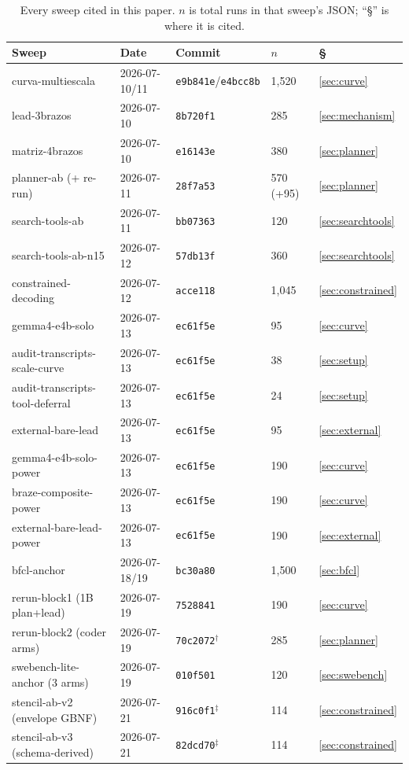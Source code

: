 \documentclass[smallcondensed,natbib]{svjour3}
\begin{document}
\begin{table}[t]
\centering\small
\caption{Every sweep cited in this paper. $n$ is total runs in that
sweep's JSON; ``\S'' is where it is cited.}
\label{tab:sweeps}
\begin{tabular}{lllll}
\toprule
Sweep & Date & Commit & $n$ & \S \\
\midrule
curva-multiescala & 2026-07-10/11 & \texttt{e9b841e}/\texttt{e4bcc8b} & 1{,}520 & \ref{sec:curve} \\
lead-3brazos & 2026-07-10 & \texttt{8b720f1} & 285 & \ref{sec:mechanism} \\
matriz-4brazos & 2026-07-10 & \texttt{e16143e} & 380 & \ref{sec:planner} \\
planner-ab (+ re-run) & 2026-07-11 & \texttt{28f7a53} & 570 (+95) & \ref{sec:planner} \\
search-tools-ab & 2026-07-11 & \texttt{bb07363} & 120 & \ref{sec:searchtools} \\
search-tools-ab-n15 & 2026-07-12 & \texttt{57db13f} & 360 & \ref{sec:searchtools} \\
constrained-decoding & 2026-07-12 & \texttt{acce118} & 1{,}045 & \ref{sec:constrained} \\
gemma4-e4b-solo & 2026-07-13 & \texttt{ec61f5e} & 95 & \ref{sec:curve} \\
audit-transcripts-scale-curve & 2026-07-13 & \texttt{ec61f5e} & 38 & \ref{sec:setup} \\
audit-transcripts-tool-deferral & 2026-07-13 & \texttt{ec61f5e} & 24 & \ref{sec:setup} \\
external-bare-lead & 2026-07-13 & \texttt{ec61f5e} & 95 & \ref{sec:external} \\
gemma4-e4b-solo-power & 2026-07-13 & \texttt{ec61f5e} & 190 & \ref{sec:curve} \\
braze-composite-power & 2026-07-13 & \texttt{ec61f5e} & 190 & \ref{sec:curve} \\
external-bare-lead-power & 2026-07-13 & \texttt{ec61f5e} & 190 & \ref{sec:external} \\
bfcl-anchor & 2026-07-18/19 & \texttt{bc30a80} & 1{,}500 & \ref{sec:bfcl} \\
rerun-block1 (1B plan+lead) & 2026-07-19 & \texttt{7528841} & 190 & \ref{sec:curve} \\
rerun-block2 (coder arms) & 2026-07-19 & \texttt{70c2072}$^{\dagger}$ & 285 & \ref{sec:planner} \\
swebench-lite-anchor (3 arms) & 2026-07-19 & \texttt{010f501} & 120 & \ref{sec:swebench} \\
stencil-ab-v2 (envelope GBNF) & 2026-07-21 & \texttt{916c0f1}$^{\ddagger}$ & 114 & \ref{sec:constrained} \\
stencil-ab-v3 (schema-derived) & 2026-07-21 & \texttt{82dcd70}$^{\ddagger}$ & 114 & \ref{sec:constrained} \\
\bottomrule
\end{tabular}
\end{table}
\end{document}
